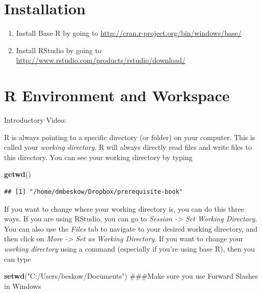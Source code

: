 \documentclass[]{book}
\newenvironment{Shaded}{\begin{snugshade}}{\end{snugshade}}
\newcommand{\KeywordTok}[1]{\textcolor[rgb]{0.13,0.29,0.53}{\textbf{{#1}}}}
\newcommand{\StringTok}[1]{\textcolor[rgb]{0.31,0.60,0.02}{{#1}}}
\newcommand{\NormalTok}[1]{{#1}}
\providecommand{\tightlist}{%
  \setlength{\itemsep}{0pt}\setlength{\parskip}{0pt}}
\begin{document}
\section{Installation}\label{installation}

\begin{enumerate}
\def\labelenumi{\arabic{enumi}.}
\tightlist
\item
  Install Base R by going to
  \url{http://cran.r-project.org/bin/windows/base/}
\item
  Install RStudio by going to
  \url{http://www.rstudio.com/products/rstudio/download/}
\end{enumerate}

\section{R Environment and Workspace}\label{r-environment-and-workspace}

Introductory Video:

R is always pointing to a specific directory (or folder) on your
computer. This is called your \emph{working directory}. R will always
directly read files and write files to this directory. You can see your
working directory by typing

\begin{Shaded}
\begin{Highlighting}[]
\KeywordTok{getwd}\NormalTok{()}
\end{Highlighting}
\end{Shaded}

\begin{verbatim}
## [1] "/home/dmbeskow/Dropbox/prerequisite-book"
\end{verbatim}

If you want to change where your working directory is, you can do this
three ways. If you are using RStudio, you can go to \emph{Session
-\textgreater{} Set Working Directory}. You can also use the
\emph{Files} tab to navigate to your desired working directory, and then
click on \emph{More -\textgreater{} Set as Working Directory}. If you
want to change your \emph{working directory} using a command (especially
if you're using base R), then you can type

\begin{Shaded}
\begin{Highlighting}[]
\KeywordTok{setwd}\NormalTok{(}\StringTok{"C:/Users/beskow/Documents"}\NormalTok{)  ###Make sure you use Forward Slashes in Windows}
\end{Highlighting}
\end{Shaded}
\end{document}
